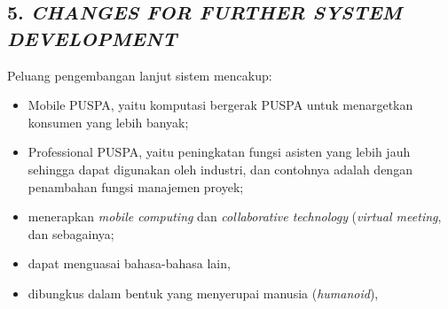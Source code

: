 \subsection*{\textcolor{subsectioncolor}{\textsf{5. \textit{CHANGES FOR FURTHER SYSTEM DEVELOPMENT}}}}

Peluang pengembangan lanjut sistem mencakup:
\begin{itemize}
\item Mobile PUSPA, yaitu komputasi bergerak PUSPA untuk menargetkan konsumen yang lebih banyak;
\item Professional PUSPA, yaitu peningkatan fungsi asisten yang lebih jauh sehingga dapat digunakan oleh industri, dan contohnya adalah dengan penambahan fungsi manajemen proyek;
\item menerapkan \textit{mobile computing} dan \textit{collaborative technology} (\textit{virtual meeting}, dan sebagainya;
\item dapat menguasai bahasa-bahasa lain,
\item dibungkus dalam bentuk yang menyerupai manusia (\textit{humanoid}),
\end{itemize}
